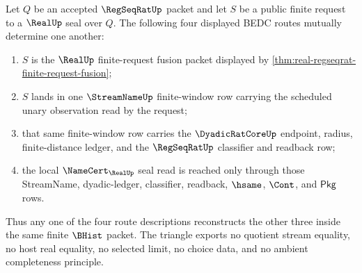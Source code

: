 \begin{theorem}
\label{thm:real-regseqrat-finite-request-triangle}
Let $Q$ be an accepted $\RegSeqRatUp$ packet and let $S$ be a public finite request to a $\RealUp$ seal over $Q$. The following four displayed BEDC routes mutually determine one another:
\begin{enumerate}
\item $S$ is the $\RealUp$ finite-request fusion packet displayed by \autoref{thm:real-regseqrat-finite-request-fusion};
\item $S$ lands in one $\StreamNameUp$ finite-window row carrying the scheduled unary observation read by the request;
\item that same finite-window row carries the $\DyadicRatCoreUp$ endpoint, radius, finite-distance ledger, and the $\RegSeqRatUp$ classifier and readback row;
\item the local $\NameCert_{\RealUp}$ seal read is reached only through those StreamName, dyadic-ledger, classifier, readback, $\hsame$, $\Cont$, and $\mathsf{Pkg}$ rows.
\end{enumerate}
Thus any one of the four route descriptions reconstructs the other three inside the same finite $\BHist$ packet. The triangle exports no quotient stream equality, no host real equality, no selected limit, no choice data, and no ambient completeness principle.
\end{theorem}
